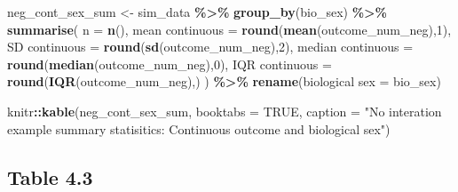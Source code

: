 \documentclass[
]{book}
\newenvironment{Shaded}{\begin{snugshade}}{\end{snugshade}}
\newcommand{\AttributeTok}[1]{\textcolor[rgb]{0.13,0.29,0.53}{#1}}
\newcommand{\ConstantTok}[1]{\textcolor[rgb]{0.56,0.35,0.01}{#1}}
\newcommand{\DecValTok}[1]{\textcolor[rgb]{0.00,0.00,0.81}{#1}}
\newcommand{\FunctionTok}[1]{\textcolor[rgb]{0.13,0.29,0.53}{\textbf{#1}}}
\newcommand{\NormalTok}[1]{#1}
\newcommand{\OtherTok}[1]{\textcolor[rgb]{0.56,0.35,0.01}{#1}}
\newcommand{\SpecialCharTok}[1]{\textcolor[rgb]{0.81,0.36,0.00}{\textbf{#1}}}
\newcommand{\StringTok}[1]{\textcolor[rgb]{0.31,0.60,0.02}{#1}}
\begin{document}
\begin{Shaded}
\begin{Highlighting}[]
\NormalTok{neg\_cont\_sex\_sum }\OtherTok{\textless{}{-}}\NormalTok{ sim\_data }\SpecialCharTok{\%\textgreater{}\%} \FunctionTok{group\_by}\NormalTok{(bio\_sex) }\SpecialCharTok{\%\textgreater{}\%} 
  \FunctionTok{summarise}\NormalTok{(}
    \AttributeTok{n =} \FunctionTok{n}\NormalTok{(), }
    \StringTok{\textasciigrave{}}\AttributeTok{mean continuous}\StringTok{\textasciigrave{}} \OtherTok{=} \FunctionTok{round}\NormalTok{(}\FunctionTok{mean}\NormalTok{(outcome\_num\_neg),}\DecValTok{1}\NormalTok{),}
    \StringTok{\textasciigrave{}}\AttributeTok{SD continuous}\StringTok{\textasciigrave{}} \OtherTok{=} \FunctionTok{round}\NormalTok{(}\FunctionTok{sd}\NormalTok{(outcome\_num\_neg),}\DecValTok{2}\NormalTok{),}
    \StringTok{\textasciigrave{}}\AttributeTok{median continuous}\StringTok{\textasciigrave{}} \OtherTok{=} \FunctionTok{round}\NormalTok{(}\FunctionTok{median}\NormalTok{(outcome\_num\_neg),}\DecValTok{0}\NormalTok{),}
    \StringTok{\textasciigrave{}}\AttributeTok{IQR continuous}\StringTok{\textasciigrave{}} \OtherTok{=} \FunctionTok{round}\NormalTok{(}\FunctionTok{IQR}\NormalTok{(outcome\_num\_neg),)}
\NormalTok{  ) }\SpecialCharTok{\%\textgreater{}\%} 
  \FunctionTok{rename}\NormalTok{(}\StringTok{\textasciigrave{}}\AttributeTok{biological sex}\StringTok{\textasciigrave{}} \OtherTok{=}\NormalTok{ bio\_sex) }

\NormalTok{knitr}\SpecialCharTok{::}\FunctionTok{kable}\NormalTok{(neg\_cont\_sex\_sum, }\AttributeTok{booktabs =} \ConstantTok{TRUE}\NormalTok{, }\AttributeTok{caption =} \StringTok{"No interation example summary statisitics: Continuous outcome and biological sex"}\NormalTok{)}
\end{Highlighting}
\end{Shaded}

\subsection{Table 4.3}\label{table-4.3}
\end{document}
